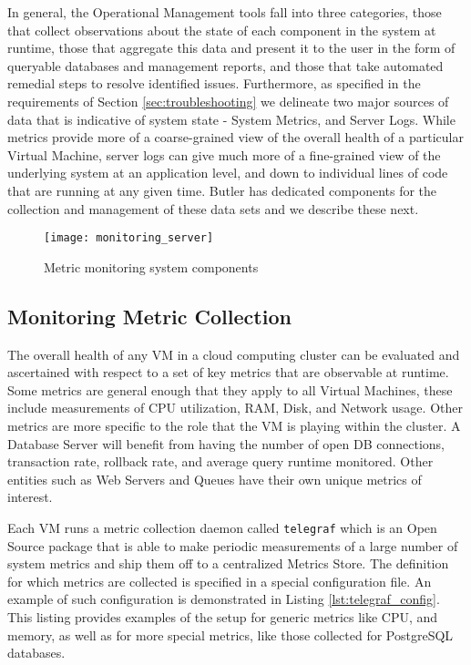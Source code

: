 In general, the Operational Management tools fall into three categories, those that collect observations about the state of each component in the system at runtime, those that aggregate this data and present it to the user in the form of queryable databases and management reports, and those that take automated remedial steps to resolve identified issues. Furthermore, as specified in the requirements of Section \ref{sec:troubleshooting} we delineate two major sources of data that is indicative of system state - System Metrics, and Server Logs. While metrics provide more of a coarse-grained view of the overall health of a particular Virtual Machine, server logs can give much more of a fine-grained view of the underlying system at an application level, and down to individual lines of code that are running at any given time. Butler has dedicated components for the collection and management of these data sets and we describe these next.

\begin{figure}[h]
\texttt{[image: monitoring\_server]}
\centering
\caption {Metric monitoring system components}
\label{fig:monitoring_server}
\end{figure}

\subsection{Monitoring Metric Collection}

The overall health of any VM in a cloud computing cluster can be evaluated and ascertained with respect to a set of key metrics that are observable at runtime. Some metrics are general enough that they apply to all Virtual Machines, these include measurements of CPU utilization, RAM, Disk, and Network usage. Other metrics are more specific to the role that the VM is playing within the cluster. A Database Server will benefit from having the number of open DB connections, transaction rate, rollback rate, and average query runtime monitored. Other entities such as Web Servers and Queues have their own unique metrics of interest.

Each VM runs a metric collection daemon called \texttt{telegraf}\autocite{telegraf} which is an Open Source package that is able to make periodic measurements of a large number of system metrics and ship them off to a centralized Metrics Store. The definition for which metrics are collected is specified in a special configuration file. An example of such configuration is demonstrated in Listing \ref{lst:telegraf_config}. This listing provides examples of the setup for generic metrics like CPU, and memory, as well as for more special metrics, like those collected for PostgreSQL databases.

